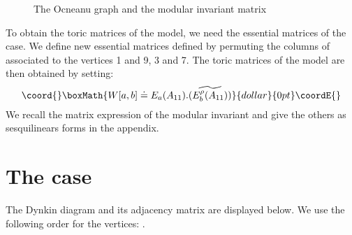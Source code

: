 \documentclass[a4paper,11pt]{article}
\let\sect=\section
\def\section{\newpage\sect}
\begin{document}
\begin{figure}[hhh]
\begin{center}
\begin{picture}
\end{picture}
\caption{The \coordHE{} Ocneanu graph and the modular invariant matrix}
\label{grocD7}
\end{center}
\end{figure}


To obtain the toric matrices of the \coordHE{} model, we need the
essential matrices \coordHE{} of the \coordHE{} case. We define new
essential matrices \coordHE{} defined by
permuting the columns of \coordHE{} associated to the vertices 1
and 9, 3 and 7.
The toric matrices of the \coordHE{} model are then obtained by setting:
$$\coord{}\boxMath{
W[a,b] \doteq E_a(A_{11}) . \widetilde{  (E_b^{\rho}(A_{11}))}
}{dollar}{0pt}\coordE{}$$
We recall the matrix expression of the modular invariant \coordHE{} and
give the others as sesquilinears forms in the appendix.






\section{The \coordHE{} case}

The \coordHE{} Dynkin diagram and its adjacency matrix are displayed
below. We use the following order for the vertices: \coordHE{}.
\end{document}
